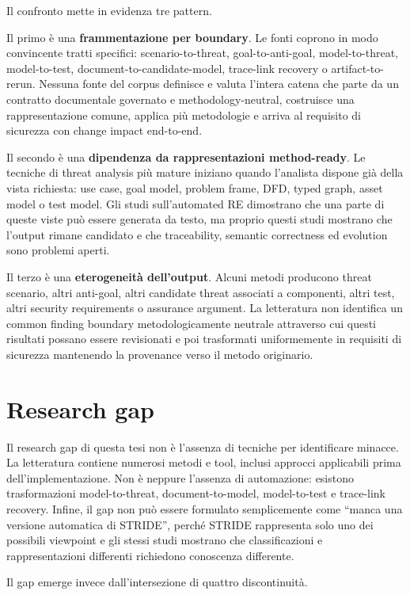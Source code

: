 \documentclass[12pt,a4paper,oneside]{report}
\begin{document}
Il confronto mette in evidenza tre pattern.

Il primo è una \textbf{frammentazione per boundary}. Le fonti coprono in modo convincente tratti specifici: scenario-to-threat, goal-to-anti-goal, model-to-threat, model-to-test, document-to-candidate-model, trace-link recovery o artifact-to-rerun. Nessuna fonte del corpus definisce e valuta l'intera catena che parte da un contratto documentale governato e methodology-neutral, costruisce una rappresentazione comune, applica più metodologie e arriva al requisito di sicurezza con change impact end-to-end.

Il secondo è una \textbf{dipendenza da rappresentazioni method-ready}. Le tecniche di threat analysis più mature iniziano quando l'analista dispone già della vista richiesta: use case, goal model, problem frame, DFD, typed graph, asset model o test model. Gli studi sull'automated RE dimostrano che una parte di queste viste può essere generata da testo, ma proprio questi studi mostrano che l'output rimane candidato e che traceability, semantic correctness ed evolution sono problemi aperti.

Il terzo è una \textbf{eterogeneità dell'output}. Alcuni metodi producono threat scenario, altri anti-goal, altri candidate threat associati a componenti, altri test, altri security requirements o assurance argument. La letteratura non identifica un common finding boundary metodologicamente neutrale attraverso cui questi risultati possano essere revisionati e poi trasformati uniformemente in requisiti di sicurezza mantenendo la provenance verso il metodo originario.

\section{Research gap}

Il research gap di questa tesi non è l'assenza di tecniche per identificare minacce. La letteratura contiene numerosi metodi e tool, inclusi approcci applicabili prima dell'implementazione. Non è neppure l'assenza di automazione: esistono trasformazioni model-to-threat, document-to-model, model-to-test e trace-link recovery. Infine, il gap non può essere formulato semplicemente come ``manca una versione automatica di STRIDE'', perché STRIDE rappresenta solo uno dei possibili viewpoint e gli stessi studi mostrano che classificazioni e rappresentazioni differenti richiedono conoscenza differente.

Il gap emerge invece dall'intersezione di quattro discontinuità.
\end{document}
